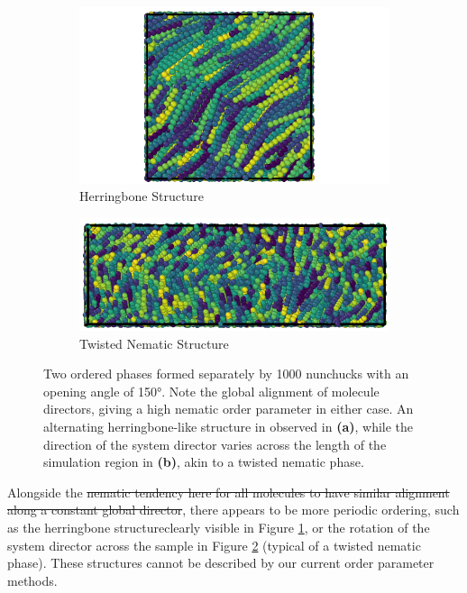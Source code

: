 \documentclass[11pt, a4paper]{article} %
\providecommand{\DIFadd}[1]{{\protect\color{blue}\uwave{#1}}} %
\providecommand{\DIFdel}[1]{{\protect\color{red}\sout{#1}}}                      %
\providecommand{\DIFaddbegin}{} %
\providecommand{\DIFaddend}{} %
\providecommand{\DIFdelbegin}{} %
\providecommand{\DIFdelend}{} %
\begin{document}
\begin{figure}
	\vspace{0.5cm}
	\centering
	\begin{subfigure}{.4\textwidth}
		\centering
		\includegraphics[width=.9\linewidth]{Figures/nun_fa_herringbone}
		\caption{Herringbone Structure}
		\label{fig:nun_fa_herringbone}
	\end{subfigure}%
	\begin{subfigure}{.6\textwidth}
		\centering
		\includegraphics[width=.9\linewidth]{Figures/nun_fa_twist}
		\caption{Twisted Nematic Structure}
		\label{fig:nun_fa_twist}
	\end{subfigure}
	\caption{Two ordered phases formed separately by \num{1000} nunchucks with an opening angle of \ang{150}. Note the global alignment of molecule directors, giving a high nematic order parameter in either case. An alternating herringbone-like structure in observed in \textbf{(a)}, while the direction of the system director varies across the length of the simulation region in \textbf{(b)}, akin to a twisted nematic phase.}
	\label{fig:nun_fa_views}
\end{figure}

Alongside the \DIFdelbegin \DIFdel{nematic tendency here for all molecules to have similar alignment along a constant global director}\DIFdelend \DIFaddbegin \DIFadd{\textcolor{forestgreen}{tendency here to form a nematic phase with all molecules having a similar alignment along a constant global director}}\DIFaddend , there appears to be more periodic ordering, such as the herringbone structure\DIFaddbegin \DIFadd{, \textcolor{forestgreen}{which is} }\DIFaddend clearly visible in Figure \ref{fig:nun_fa_herringbone}, or the rotation of the system director across the sample in Figure \ref{fig:nun_fa_twist} (typical of a twisted nematic phase). These structures cannot be described by our current order parameter methods.
\end{document}

